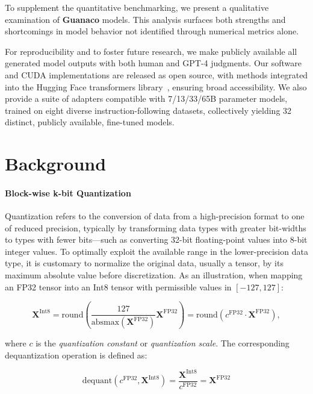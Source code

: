 To supplement the quantitative benchmarking, we present a qualitative examination of \textbf{Guanaco} models. This analysis surfaces both strengths and shortcomings in model behavior not identified through numerical metrics alone.

For reproducibility and to foster future research, we make publicly available all generated model outputs with both human and GPT-4 judgments. Our software and CUDA implementations are released as open source, with methods integrated into the Hugging Face transformers library~\citep{wolf2019huggingface}, ensuring broad accessibility. We also provide a suite of adapters compatible with 7/13/33/65B parameter models, trained on eight diverse instruction-following datasets, collectively yielding 32 distinct, publicly available, fine-tuned models.

\section{Background}
\paragraph{Block-wise k-bit Quantization} Quantization refers to the conversion of data from a high-precision format to one of reduced precision, typically by transforming data types with greater bit-widths to types with fewer bits—such as converting 32-bit floating-point values into 8-bit integer values. To optimally exploit the available range in the lower-precision data type, it is customary to normalize the original data, usually a tensor, by its maximum absolute value before discretization. As an illustration, when mapping an FP32 tensor into an Int8 tensor with permissible values in $[-127, 127]$:

\begin{equation}
    \mathbf{X}^{ \text{Int8}} = \text{round}\left( \frac{127}{{\text{absmax}}(\mathbf{X}^{{\text{FP32}}})}\mathbf{X}^{{\text{FP32}}} \right) = \text{round}(c^{\text{FP32}}\cdot \mathbf{X}^{{\text{FP32}}}),
\end{equation}

where $c$ is the {\em quantization constant} or {\em quantization scale}. The corresponding dequantization operation is defined as:

\begin{equation}
    \text{dequant}(c^{\text{FP32}}, \mathbf{X}^{\text{Int8}}) = \frac{\mathbf{X}^{\text{Int8}}}{c^{\text{FP32}}} = \mathbf{X}^{\text{FP32}}
\end{equation}

